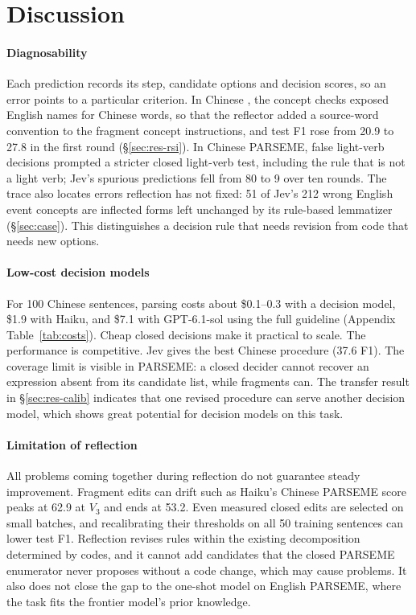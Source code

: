 \section{Discussion}
\label{sec:discussion}

\paragraph{Diagnosability}
Each prediction records its step, candidate options and decision scores, so an error points to a particular criterion. In Chinese \umr, the concept checks exposed English names for Chinese words, so that the reflector added a source-word convention to the fragment concept instructions, and test F1 rose from 20.9 to 27.8 in the first round (\S\ref{sec:res-rsi}). In Chinese PARSEME, false light-verb decisions prompted a stricter closed light-verb test, including the rule that  is not a light verb; Jev's spurious predictions fell from 80 to 9 over ten rounds. The trace also locates errors reflection has not fixed: 51 of Jev's 212 wrong English event concepts are inflected forms left unchanged by its rule-based lemmatizer (\S\ref{sec:case}). This distinguishes a decision rule that needs revision from code that needs new options.

\paragraph{Low-cost decision models}
For 100 Chinese \umr sentences, parsing costs about \$0.1--0.3 with a decision model, \$1.9 with Haiku, and \$7.1 with GPT-6.1-sol using the full guideline (Appendix Table~\ref{tab:costs}). Cheap closed decisions make it practical to scale. The performance is competitive. Jev gives the best Chinese \umr procedure (37.6 \jm{} F1). The coverage limit is visible in PARSEME: a closed decider cannot recover an expression absent from its candidate list, while fragments can. The transfer result in \S\ref{sec:res-calib} indicates that one revised procedure can serve another decision model, which shows great potential for decision models on this task.

\paragraph{Limitation of reflection}
\label{sec:disc-rsi}
All problems coming together during reflection do not guarantee steady improvement. Fragment edits can drift such as Haiku's Chinese PARSEME score peaks at 62.9 at $V_3$ and ends at 53.2. Even measured closed edits are selected on small batches, and recalibrating their thresholds on all 50 training sentences can lower test F1. Reflection revises rules within the existing decomposition determined by codes, and it cannot add candidates that the closed PARSEME enumerator never proposes without a code change, which may cause problems. It also does not close the gap to the one-shot model on English PARSEME, where the task fits the frontier model's prior knowledge.
